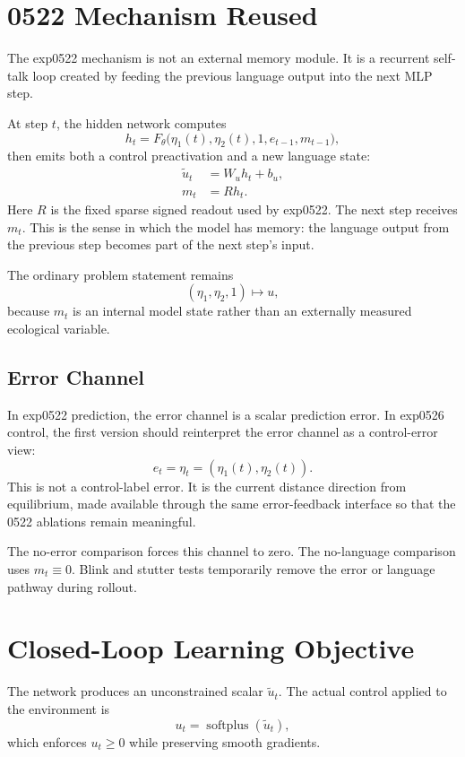 \documentclass[11pt]{article}
\newcommand{\softplus}{\operatorname{softplus}}
\begin{document}
\section{0522 Mechanism Reused}

The exp0522 mechanism is not an external memory module. It is a recurrent
self-talk loop created by feeding the previous language output into the
next MLP step.

At step \(t\), the hidden network computes
\[
  h_t = F_\theta\big(\eta_1(t),\eta_2(t),1,e_{t-1},m_{t-1}\big),
\]
then emits both a control preactivation and a new language state:
\begin{align}
  \tilde u_t &= W_u h_t+b_u,\\
  m_t &= R h_t.
\end{align}
Here \(R\) is the fixed sparse signed readout used by exp0522. The next
step receives \(m_t\). This is the sense in which the model has memory:
the language output from the previous step becomes part of the next step's
input.

The ordinary problem statement remains
\[
  (\eta_1,\eta_2,1)\mapsto u,
\]
because \(m_t\) is an internal model state rather than an externally
measured ecological variable.

\subsection*{Error Channel}

In exp0522 prediction, the error channel is a scalar prediction error.
In exp0526 control, the first version should reinterpret the error channel
as a control-error view:
\[
  e_t = \eta_t = (\eta_1(t),\eta_2(t)).
\]
This is not a control-label error. It is the current distance direction
from equilibrium, made available through the same error-feedback interface
so that the 0522 ablations remain meaningful.

The no-error comparison forces this channel to zero. The no-language
comparison uses \(m_t\equiv 0\). Blink and stutter tests temporarily
remove the error or language pathway during rollout.

\section{Closed-Loop Learning Objective}

The network produces an unconstrained scalar \(\tilde u_t\). The actual
control applied to the environment is
\[
  u_t=\softplus(\tilde u_t),
  \label{eq:softplus-control}
\]
which enforces \(u_t\ge 0\) while preserving smooth gradients.
\end{document}
